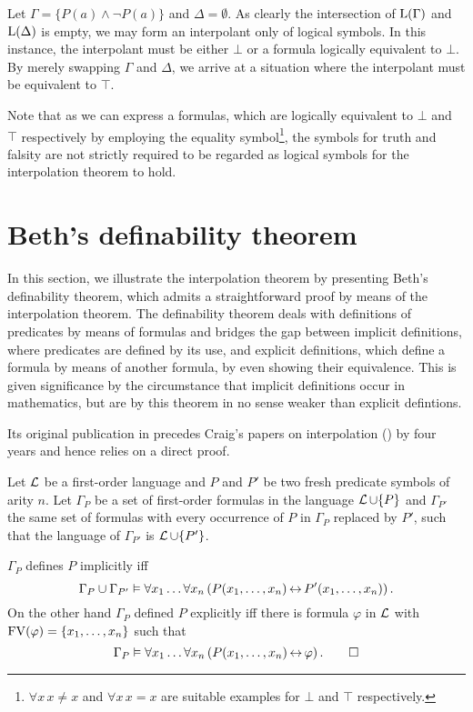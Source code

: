 \begin{exa}
	Let $\Gamma = \{ P(a) \land \lnot P(a) \} $ and $\Delta = \emptyset$.
	As clearly the intersection of $\operatorname{L}(\Gamma)$ and $\operatorname{L}(\Delta)$ is empty, we may form an interpolant only of logical symbols.
	In this instance, the interpolant must be either $\bot$ or a formula logically equivalent to $\bot$.
	By merely swapping $\Gamma$ and $\Delta$, we arrive at a situation where the interpolant must be equivalent to $\top$.

	Note that as we can express a formulas, which are logically equivalent to $\bot$ and $\top$ respectively by employing the equality symbol\footnote{$\forall x\,x\neq x$ and $\forall x\,x=x$ are suitable examples for $\bot$ and $\top$ respectively.}, the symbols for truth and falsity are not strictly required to be regarded as logical symbols for the interpolation theorem to hold.
\end{exa}


\section{Beth's definability theorem}
\label{sec:beth}

In this section, we illustrate the interpolation theorem by presenting Beth's definability theorem, which admits a straightforward proof by means of the interpolation theorem. 
The definability theorem deals with definitions of predicates by means of formulas and bridges the gap between implicit definitions, where predicates are defined by its use, and explicit definitions, which define a formula by means of another formula, by even showing their equivalence.
This is given significance by the circumstance that implicit definitions occur in mathematics, but are by this theorem in no sense weaker than explicit defintions.

Its original publication in \cite{beth1953} precedes Craig's papers on interpolation (\cite{Craig57linear,Craig57three}) by four years and hence relies on a direct proof.
 

\begin{defi}
	Let $\operatorname{\mathcal{L}}$ be a first-order language and
	$P$ and $P'$ be two fresh predicate symbols of arity $n$.
	Let $\Gamma_P$ be a set of first-order formulas
	in the language $\operatorname{\mathcal{L}}\cup\{P\}$ 
	and $\Gamma_{P'}$ the same set of formulas with every occurrence of $P$ in $\Gamma_P$ replaced by\nolinebreak{} $P'$, such that the language of $\Gamma_{P'}$ is $\operatorname{\mathcal{L}} \cup\{P'\}$.

	$\Gamma_P$ defines $P$ implicitly iff
	\[\Gamma_P \cup \Gamma_{P'} \vDash \forall x_1\dots \forall x_n \left(  P(x_1, \dots, x_n) \operatorname{\leftrightarrow} P'(x_1, \dots, x_n)\right).\]
	On the other hand $\Gamma_P$ defined $P$ explicitly iff there is formula $\varphi$ in $\operatorname{\mathcal{L}}$ with $\operatorname{FV}(\varphi) = \{x_1, \dots, x_n\}$ such that 
	\[\Gamma_P\vDash \forall x_1\dots \forall x_n \left(  P(x_1, \dots, x_n) \operatorname{\leftrightarrow} \varphi\right).\qedhere\]
\end{defi}

